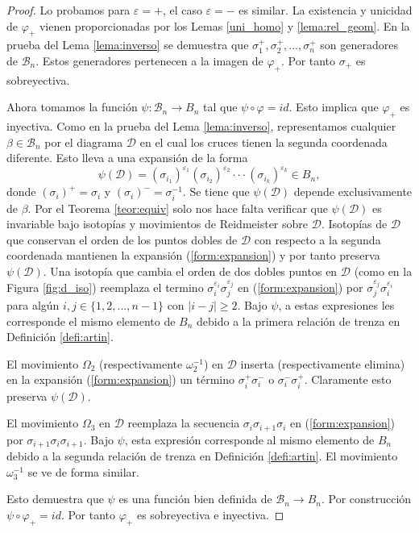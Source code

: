 \documentclass[12pt]{book}
\theoremstyle{definition}
\begin{document}
\begin{proof} Lo probamos para $\varepsilon = +$, el caso $\varepsilon = -$ es similar. La existencia y unicidad de $\varphi_+$ vienen proporcionadas por los Lemas \ref{uni_homo} y \ref{lema:rel_geom}. En la prueba del Lema \ref{lema:inverso} se demuestra que $\sigma_1^+,\sigma_2^+,...,\sigma_n^+$ son generadores de $\mathcal{B}_n$. Estos generadores pertenecen a la imagen de $\varphi_+$. Por tanto $\sigma_+$ es sobreyectiva.

Ahora tomamos la función $\psi :\mathcal{B}_n\rightarrow B_n$ tal que $\psi \circ \varphi = id$. Esto implica que $\varphi_+$ es inyectiva. Como en la prueba del Lema \ref{lema:inverso}, representamos cualquier $\beta\in\mathcal{B}_n$ por el diagrama $\mathcal{D}$ en el cual los cruces tienen la segunda coordenada diferente. Esto lleva a una expansión de la forma \label{hola}
\begin{equation}\label{form:expansion}
\psi(\mathcal{D})=(\sigma_{i_1})^{\varepsilon_1}(\sigma_{i_2})^{\varepsilon_2}\cdot\cdot\cdot(\sigma_{i_k})^{\varepsilon_k}\in B_n,
\end{equation}
donde $(\sigma_i)^+=\sigma_i$ y $(\sigma_i)^-=\sigma_i^{-1}$. Se tiene que $\psi(\mathcal{D})$ depende exclusivamente de $\beta$. Por el Teorema \ref{teor:equiv} solo nos hace falta verificar que $\psi(\mathcal{D})$ es invariable bajo isotopías y movimientos de Reidmeister sobre $\mathcal{D}$. Isotopías de $\mathcal{D}$ que conservan el orden de los puntos dobles de $\mathcal{D}$ con respecto a la segunda coordenada mantienen la expansión (\ref{form:expansion}) y por tanto preserva $\psi(\mathcal{D})$. Una isotopía que cambia el orden de dos dobles puntos en $\mathcal{D}$ (como en la Figura \ref{fig:d_iso}) reemplaza el termino $\sigma_i^{\varepsilon_i}\sigma_j^{\varepsilon_j}$ en (\ref{form:expansion}) por $\sigma_j^{\varepsilon_j}\sigma_i^{\varepsilon_i}$ para algún $i,j\in\{1,2,...,n-1\}$ con $|i-j|\geq 2$. Bajo $\psi$, a estas expresiones les corresponde el mismo elemento de $B_n$ debido a la primera relación de trenza en Definición
 \ref{defi:artin}.

El movimiento $\Omega_2$ (respectivamente $\omega_2^{-1}$) en $\mathcal{D}$ inserta (respectivamente elimina) en la expansión (\ref{form:expansion}) un término $\sigma_i^+\sigma_i^-$ o $\sigma_i^-\sigma_i^+$. Claramente esto preserva $\psi(\mathcal{D})$.

El movimiento $\Omega_3$ en $\mathcal{D}$ reemplaza la secuencia $\sigma_{i}\sigma_{i+1}\sigma_{i}$ en (\ref{form:expansion}) por $\sigma_{i+1}\sigma_{i}\sigma_{i+1}$. Bajo $\psi$, esta expresión corresponde al mismo elemento de $B_n$ debido a la segunda relación de trenza en Definición \ref{defi:artin}. El movimiento $\omega_3^{-1}$ se ve de forma similar.

Esto demuestra que $\psi$ es una función bien definida de $\mathcal{B}_n\rightarrow B_n$. Por construcción $\psi\circ\varphi_+=id$. Por tanto $\varphi_+$ es sobreyectiva e inyectiva.
\end{proof}
\end{document}
